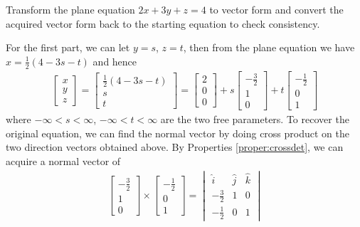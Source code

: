 \begin{exmp}
\label{exmp:vecgeohighdim}
Transform the plane equation $2x+3y+z = 4$ to vector form and convert the acquired vector form back to the starting equation to check consistency.
\end{exmp}
\begin{solution}
For the first part, we can let $y=s$, $z=t$, then from the plane equation we have $x = \frac{1}{2}(4-3s-t)$ and hence
\begin{align*}
\begin{bmatrix}
x \\
y \\
z
\end{bmatrix}
=
\begin{bmatrix}
\frac{1}{2}(4-3s-t) \\
s \\
t
\end{bmatrix}
=
\begin{bmatrix}
2 \\
0 \\
0
\end{bmatrix}
+ s
\begin{bmatrix}
-\frac{3}{2} \\
1 \\
0
\end{bmatrix}
+ t
\begin{bmatrix}
-\frac{1}{2} \\
0 \\
1
\end{bmatrix}
\end{align*}
where $-\infty < s < \infty$, $-\infty < t < \infty$ are the two free parameters. To recover the original equation, we can find the normal vector by doing cross product on the two direction vectors obtained above. By Properties \ref{proper:crossdet}, we can acquire a normal vector of
\begin{align*}
\begin{bmatrix}
-\frac{3}{2} \\
1 \\
0
\end{bmatrix}
\times
\begin{bmatrix}
-\frac{1}{2} \\
0 \\
1
\end{bmatrix}
=
\begin{vmatrix}
\hat{i} & \hat{j} & \hat{k} \\
-\frac{3}{2} & 1 & 0 \\
-\frac{1}{2} & 0 & 1

\end{vmatrix}
\end{align*}
\end{solution}
